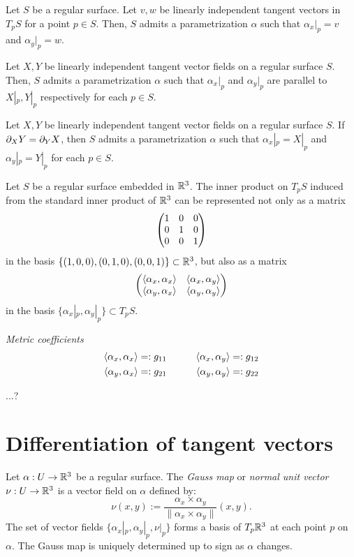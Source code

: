 \documentclass{../note}
\def\a{\alpha}
\begin{document}

\begin{thm}
Let $S$ be a regular surface.
Let $v,w$ be linearly independent tangent vectors in $T_pS$ for a point $p\in S$.
Then, $S$ admits a parametrization $\a$ such that $\a_x|_p=v$ and $\a_y|_p=w$.
\end{thm}
\begin{thm}
Let $X,Y$ be linearly independent tangent vector fields on a regular surface $S$.
Then, $S$ admits a parametrization $\a$ such that $\a_x|_p$ and $\a_y|_p$ are parallel to $X|_p,Y|_p$ respectively for each $p\in S$.
\end{thm}
\begin{thm}
Let $X,Y$ be linearly independent tangent vector fields on a regular surface $S$.
If $\pd_XY=\pd_YX$, then $S$ admits a parametrization $\a$ such that $\a_x|_p=X|_p$ and $\a_y|_p=Y|_p$ for each $p\in S$.
\end{thm}

Let $S$ be a regular surface embedded in $\mathbb{R}^3$.
The inner product on $T_pS$ induced from the standard inner product of $\mathbb{R}^3$ can be represented not only as a matrix
\[\begin{pmatrix}1&0&0\\0&1&0\\0&0&1\end{pmatrix}\]
in the basis $\{(1,0,0),(0,1,0),(0,0,1)\}\subset\mathbb{R}^3$, but also as a matrix
\[\mat{\<\a_x,\a_x\>&\<\a_x,\a_y\>\\\<\a_y,\a_x\>&\<\a_y,\a_y\>}\]
in the basis $\{\a_x|_p,\a_y|_p\}\subset T_pS$.

\begin{defn}
\emph{Metric coefficients}
\begin{alignat*}{2}
\<\a_x,\a_x\>&=:g_{11}&\qquad
\<\a_x,\a_y\>&=:g_{12}\\
\<\a_y,\a_x\>&=:g_{21}&
\<\a_y,\a_y\>&=:g_{22}
\end{alignat*}
\end{defn}

\begin{thm}
...?
\end{thm}




\section{Differentiation of tangent vectors}

\begin{defn}
Let $\a:U\to\R^3$ be a regular surface.
The \emph{Gauss map} or \emph{normal unit vector} $\nu:U\to\mathbb{R}^3$ is a vector field on $\a$ defined by:
\[\nu(x,y):=\frac{\a_x\times \a_y}{\|\a_x\times \a_y\|}(x,y).\]
The set of vector fields $\{\a_x|_p,\a_y|_p,\nu|_p\}$ forms a basis of $T_p\mathbb{R}^3$ at each point $p$ on $\a$.
The Gauss map is uniquely determined up to sign as $\a$ changes.
\end{defn}
\end{document}
